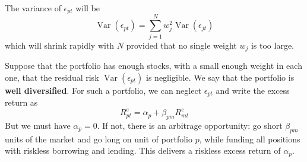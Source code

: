 \documentclass[11pt,green,twocol,citestyle=authoryear, bibstyle=authoryear]{elegantbook}
\begin{document}
The variance of $ \epsilon_{p t} $ will be 
\begin{equation*}
    \operatorname{Var}\left(\epsilon_{p t}\right)=\sum_{j=1}^N w_j^2 \operatorname{Var}\left(\epsilon_{j t}\right)
\end{equation*}
which will shrink rapidly with $ N $  provided that no single weight $ w_j $  is too large.

Suppose that the portfolio has enough stocks, with a small enough weight in each one, that the residual risk $ \operatorname{Var}\left(\epsilon_{p t}\right) $ is negligible. We say that the portfolio is \textbf{well diversified}. For such a portfolio, we can neglect $ \epsilon_{p t} $ and write the excess return as
\begin{equation*}
    R_{p t}^e=\alpha_p+\beta_{p m} R_{m t}^e
\end{equation*}
But we must have $ \alpha_p  = 0 $. If not, there is an arbitrage opportunity: go short $ \beta_{pm} $ units of the market and go long on unit of portfolio $ p $, while funding all positions with riskless borrowing and lending. This delivers a riskless excess return of $ \alpha_p $.  
\end{document}
